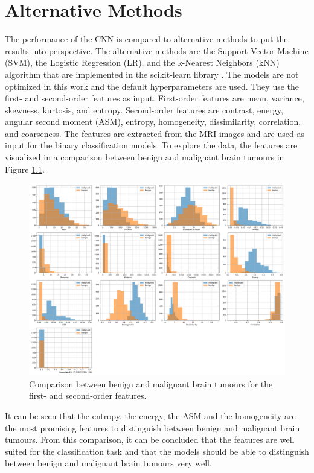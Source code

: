 \chapter{Alternative Methods}
\label{cha:alternative_methods}

The performance of the CNN is compared to alternative methods to put the results into perspective.
The alternative methods are the Support Vector Machine (SVM), the Logistic Regression (LR), and the k-Nearest Neighbors (kNN) algorithm that are implemented in the scikit-learn library \cite{scikit-learn}.
The models are not optimized in this work and the default hyperparameters are used.
They use the first- and second-order features as input.
First-order features are mean, variance, skewness, kurtosis, and entropy.
Second-order features are contrast, energy, angular second moment (ASM), entropy, homogeneity, dissimilarity, correlation, and coarseness.
The features are extracted from the MRI images and are used as input for the binary classification models.
To explore the data, the features are visualized in a comparison between benign and malignant brain tumours in Figure \ref{fig:benign_malignant_comparison}.
\begin{figure}[H]
    \centering
    \includegraphics[width=.8\textwidth]{plots/benign_malignant_comparison.pdf}
    \caption{Comparison between benign and malignant brain tumours for the first- and second-order features.}
    \label{fig:benign_malignant_comparison}
\end{figure}
It can be seen that the entropy, the energy, the ASM and the homogeneity are the most promising features to distinguish between benign and malignant brain tumours.
From this comparison, it can be concluded that the features are well suited for the classification task and that the models should be able to distinguish between benign and malignant brain tumours very well.

